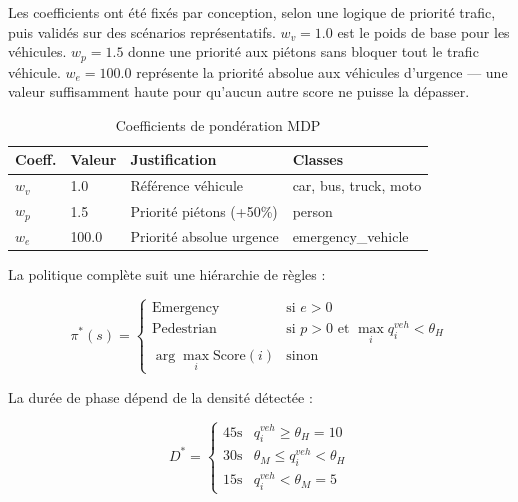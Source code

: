 Les coefficients ont été fixés par conception,
selon une logique de priorité trafic, puis
validés sur des scénarios représentatifs.
$w_v = 1.0$ est le poids de base pour les
véhicules. $w_p = 1.5$ donne une priorité
aux piétons sans bloquer tout le trafic
véhicule. $w_e = 100.0$ représente la
priorité absolue aux véhicules d'urgence —
une valeur suffisamment haute pour qu'aucun
autre score ne puisse la dépasser.

\begin{table}[H]
\centering
\caption{Coefficients de pondération MDP}
\begin{tabularx}{\textwidth}{llXl}
\toprule
\textbf{Coeff.} &
\textbf{Valeur} &
\textbf{Justification} &
\textbf{Classes} \\
\midrule
$w_v$ & 1.0 &
Référence véhicule &
car, bus, truck, moto \\
$w_p$ & 1.5 &
Priorité piétons (+50\%) &
person \\
$w_e$ & 100.0 &
Priorité absolue urgence &
emergency\_vehicle \\
\bottomrule
\end{tabularx}
\label{tab:coefficients}
\end{table}

La politique complète suit une hiérarchie
de règles :

\begin{equation}
\pi^*(s) =
\begin{cases}
\text{Emergency} &
\text{si } e > 0 \\[6pt]
\text{Pedestrian} &
\text{si } p > 0 \text{ et }
\max_i q_i^{veh} < \theta_H \\[6pt]
\arg\max_i \text{Score}(i) &
\text{sinon}
\end{cases}
\label{eq:policy}
\end{equation}

La durée de phase dépend de la densité
détectée :

\begin{equation}
D^* =
\begin{cases}
45\text{s} & q_i^{veh} \geq \theta_H = 10 \\
30\text{s} & \theta_M \leq q_i^{veh}
             < \theta_H \\
15\text{s} & q_i^{veh} < \theta_M = 5
\end{cases}
\label{eq:duration}
\end{equation}

